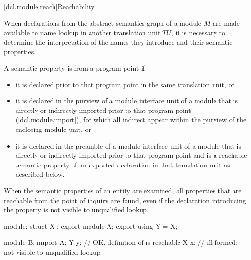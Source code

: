 [dcl.module.reach]{Reachability}

\begin{std.txt}\color{addclr}
  \resetalinea[0]
  \alinea
  When declarations from the abstract semantics graph of a module $M$
   are made available 
  to name lookup in another translation unit $TU$, it is necessary to
  determine the interpretation of the names they introduce and their
  semantic properties.
\begin{after}\color{addclr}
  \alinea
  A semantic property is  from a program point if
  \begin{itemize}\color{addclr}
  \item it is declared prior to that program point in the same translation unit, or
  \item it is declared in the purview of a module interface unit of a module
  that is directly or indirectly imported prior to that program point (\ref{dcl.module.import}),
  for which all indirect  appear within the
  purview of the enclosing module unit, or
  \item it is declared in the preamble of a module interface unit of a module
  that is directly
  or indirectly imported prior to that program point
  and is a reachable semantic property of an exported declaration
  in that translation unit as described below.
  \end{itemize}
  When the semantic properties of an entity are examined,
  all properties that are reachable from
  the point of inquiry are found,
  even if the declaration introducing the property
  is not visible to unqualified lookup.
\begin{example}
\begin{codeblock}
module;
struct X {};
export module A;
export using Y = X;

module B;
import A;
Y y;            // OK, definition of  is reachable
X x;            // ill-formed:  not visible to unqualified lookup
\end{codeblock}
\end{example}
\end{after}


\end{std.txt}
